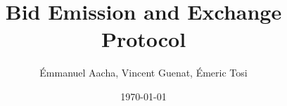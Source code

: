 \documentclass[a4paper,11pt]{report}
\begin{document}
\title{Bid Emission and Exchange Protocol}
\author{Émmanuel Aacha, Vincent Guenat, Émeric Tosi}
\date{\today}


    \maketitle{}



    \setcounter{tocdepth}{1} %
    \renewcommand{\contentsname}{Sommaire} %
    \tableofcontents{} %
    \clearpage


    
    \clearpage

%    

    \clearpage
\end{document}
